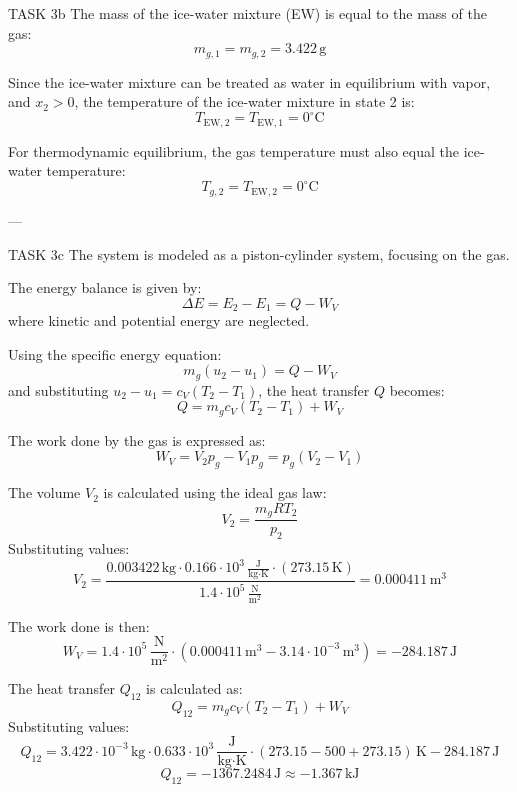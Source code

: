 TASK 3b  
The mass of the ice-water mixture (EW) is equal to the mass of the gas:  
\[
m_{g,1} = m_{g,2} = 3.422 \, \text{g}
\]  

Since the ice-water mixture can be treated as water in equilibrium with vapor, and \( x_2 > 0 \), the temperature of the ice-water mixture in state 2 is:  
\[
T_{\text{EW},2} = T_{\text{EW},1} = 0^\circ\text{C}
\]  

For thermodynamic equilibrium, the gas temperature must also equal the ice-water temperature:  
\[
T_{g,2} = T_{\text{EW},2} = 0^\circ\text{C}
\]  

---

TASK 3c  
The system is modeled as a piston-cylinder system, focusing on the gas.  

The energy balance is given by:  
\[
\Delta E = E_2 - E_1 = Q - W_V
\]  
where kinetic and potential energy are neglected.  

Using the specific energy equation:  
\[
m_g (u_2 - u_1) = Q - W_V
\]  
and substituting \( u_2 - u_1 = c_V (T_2 - T_1) \), the heat transfer \( Q \) becomes:  
\[
Q = m_g c_V (T_2 - T_1) + W_V
\]  

The work done by the gas is expressed as:  
\[
W_V = V_2 p_g - V_1 p_g = p_g (V_2 - V_1)
\]  

The volume \( V_2 \) is calculated using the ideal gas law:  
\[
V_2 = \frac{m_g R T_2}{p_2}
\]  
Substituting values:  
\[
V_2 = \frac{0.003422 \, \text{kg} \cdot 0.166 \cdot 10^3 \, \frac{\text{J}}{\text{kg·K}} \cdot (273.15 \, \text{K})}{1.4 \cdot 10^5 \, \frac{\text{N}}{\text{m}^2}} = 0.000411 \, \text{m}^3
\]  

The work done is then:  
\[
W_V = 1.4 \cdot 10^5 \, \frac{\text{N}}{\text{m}^2} \cdot (0.000411 \, \text{m}^3 - 3.14 \cdot 10^{-3} \, \text{m}^3) = -284.187 \, \text{J}
\]  

The heat transfer \( Q_{12} \) is calculated as:  
\[
Q_{12} = m_g c_V (T_2 - T_1) + W_V
\]  
Substituting values:  
\[
Q_{12} = 3.422 \cdot 10^{-3} \, \text{kg} \cdot 0.633 \cdot 10^3 \, \frac{\text{J}}{\text{kg·K}} \cdot (273.15 - 500 + 273.15) \, \text{K} - 284.187 \, \text{J}
\]  
\[
Q_{12} = -1367.2484 \, \text{J} \approx -1.367 \, \text{kJ}
\]  

